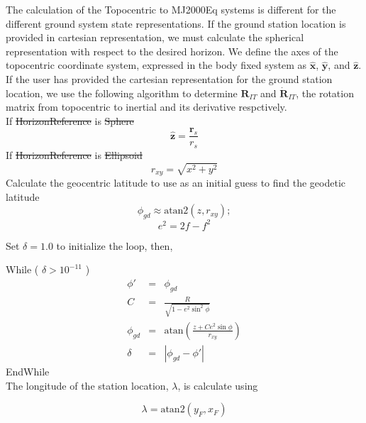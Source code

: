 {The calculation of the Topocentric to MJ2000Eq systems is different
for the different ground system state representations.  If the
ground station location is provided in cartesian representation, we
must calculate the spherical representation with respect to the
desired horizon. We define the axes of the topocentric coordinate
system, expressed in the body fixed system as $\hat{\mathbf{x}}$,
$\hat{\mathbf{y}}$, and $\hat{\mathbf{z}}$. If the user has provided
the  cartesian representation for the ground station location, we
use the following algorithm to determine $\mathbf{R}_{IT}$ and
$\dot{\mathbf{R}}_{IT}$, the rotation matrix from topocentric to
inertial and its
derivative respctively.\\



\noindent If \st{HorizonReference} is \st{Sphere}
%
\begin{equation}
     \hat{\mathbf{z}} = \frac{\mathbf{r}_s}{r_s}
\end{equation}
If \st{HorizonReference} is \st{Ellipsoid}
\begin{equation}
     r_{xy} = \sqrt{ x^2 + y^2 }
\end{equation}
%
Calculate the geocentric latitude to use as an initial guess to find
the geodetic latitude
%
\begin{equation}
     \phi_{gd}  \approx \mbox{atan2}(z,  r_{xy}  );
\end{equation}
%
\begin{equation}
    e^2 = 2f-f^2
\end{equation}
%

\noindent Set $\delta = 1.0$ to initialize the loop, then,


\noindent While ( $\delta > 10^{-11}$ )
%
\begin{eqnarray}
   \phi' & = & \phi_{gd}\\
   C & = & \frac{R} { \sqrt{1 - e^2\sin^2{\phi}}    }\\
   \phi_{gd} & = & \mbox{atan} \left( \frac{z + C
   e^2\sin{\phi}}{r_{xy}}
   \right)\\
   \delta & = & | \phi_{gd} - \phi' |
\end{eqnarray}
%
EndWhile\\


The longitude  of the station location, $\lambda$,  is calculate
using

\begin{equation}
    \lambda = \mbox{atan2}(y_F,x_F)
\end{equation}

}

